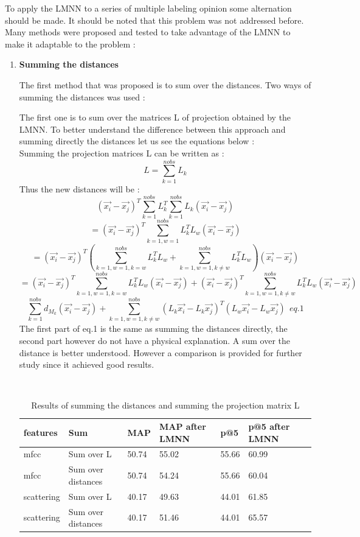 \documentclass[hidelinks,12pt]{report}
\begin{document}
To apply the LMNN to a series of multiple labeling opinion some alternation should be made. It should be noted that this problem was not addressed before. Many methods were proposed and tested to take advantage of the LMNN to make it adaptable to the problem : 
\begin{enumerate}
\item \textbf{Summing the distances} \par 
The first method that was proposed is to sum over the distances. Two ways of summing the distances was used :\par The first one is to sum over the matrices L of projection obtained by the LMNN. To better understand the difference between this approach and summing directly the distances let us see the equations below : \\
Summing the projection matrices L can be written as :
$$L=\sum_{k=1}^{nobs}L_k$$
Thus the new distances will be :
 $$(\vec{x_i}-\vec{x_j})^T\sum_{k=1}^{nobs}L_k^T\sum_{k=1}^{nobs}L_k(\vec{x_i}-\vec{x_j})$$
  $$=(\vec{x_i}-\vec{x_j})^T\sum_{k=1,w=1}^{nobs}L_k^TL_w(\vec{x_i}-\vec{x_j})$$
  $$=(\vec{x_i}-\vec{x_j})^T(\sum_{k=1,w=1,k=w}^{nobs}L_k^TL_w+\sum_{k=1,w=1,k\neq w}^{nobs}L_k^TL_w)(\vec{x_i}-\vec{x_j})$$
   $$=(\vec{x_i}-\vec{x_j})^T\sum_{k=1,w=1,k=w}^{nobs}L_k^TL_w(\vec{x_i}-\vec{x_j})+(\vec{x_i}-\vec{x_j})^T\sum_{k=1,w=1,k\neq w}^{nobs}L_k^TL_w(\vec{x_i}-\vec{x_j})$$
  $$\sum_{k=1}^{nobs}d_{M_k}(\vec{x_i}-\vec{x_j})+\sum_{k=1,w=1,k\neq w}^{nobs}(L_k\vec{x_i}-L_k\vec{x_j})^T(L_w\vec{x_i}-L_w\vec{x_j})\ \ eq.1$$
 The first part of eq.1 is the same as summing the distances directly, the second part however do not have a physical explanation. A sum over the distance is better understood. However a comparison is provided for further study since it achieved good results.
 
 \begin{table}[H]
\begin{center} 
\ 
 \setlength{\tabcolsep}{.16667em} 
\begin{tabular}{ | l | l | l | l | l | l | l |} 
\hline
features & Sum & MAP & MAP after LMNN & p@5 & p@5 after LMNN  \\ 
\hline 
mfcc & Sum over L& 50.74 &55.02 & 55.66 & 60.99 \\ 
mfcc & Sum over distances & 50.74 & 54.24 & 55.66 & 60.04  \\ 
scattering& Sum over L & 40.17 & 49.63 & 44.01 & 61.85  \\ 
scattering & Sum over distances & 40.17 & 51.46 & 44.01 & 65.57  \\
\hline
\end{tabular} 
\end{center} 
\caption{Results of summing the distances and summing the projection matrix L} 
\label{you} 
\end{table}
 

\end{enumerate}
\end{document}
